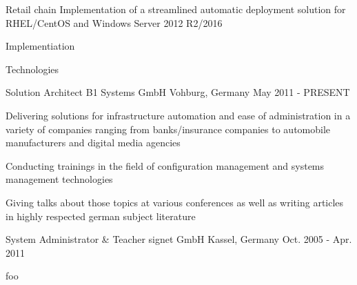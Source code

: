

\begin{cventries}
  \cventry
    {Retail chain}
    {Implementation of a streamlined automatic deployment solution for RHEL/CentOS and Windows
      Server 2012 R2/2016}
    {}
    {}
    {
      \begin{cvitems}
      \item Implementiation
      \item Technologies
      \end{cvitems}
    }

\end{cventries}

\begin{cventries}

  \cventry
    {Solution Architect} %
    {B1 Systems GmbH} %
    {Vohburg, Germany} %
    {May 2011 - PRESENT} %
    {
      \begin{cvitems} %
        \item Delivering solutions for infrastructure automation and ease of administration in a variety of companies ranging from banks/insurance companies to automobile manufacturers and digital media agencies
        \item Conducting trainings in the field of configuration management and systems management technologies
        \item Giving talks about those topics at various conferences as well as writing articles in highly respected german subject literature
      \end{cvitems}
    }

  \cventry
    {System Administrator \& Teacher} %
    {signet GmbH} %
    {Kassel, Germany} %
    {Oct. 2005 - Apr. 2011} %
    {
      \begin{cvitems} %
        \item foo
      \end{cvitems}
    }

\end{cventries}
